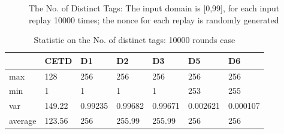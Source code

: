\documentclass{article}
\begin{document}
\begin{figure}
  \hspace{0in}
  \hspace{0in}
  \caption{The No. of Distinct Tags: The input domain is [0,99], for each input replay 10000 times; the nonce for each replay is randomly generated}
\label{fig:replay_10000} %
\end{figure}



\begin{table}[htbp] 
  \centering
  \caption{Statistic on the No. of distinct tags: 10000 rounds case}
    \begin{tabular}{l|l|l|l|l|l|l}
    \toprule
          & CETD  & D1    & D2    & D3    & D5    & D6 \\
    \midrule
    max   & 128   & 256   & 256   & 256   & 256   & 256 \\
    min   & 1     & 1     & 1     & 1     & 253   & 255 \\
    var   & 149.22 & 0.99235 & 0.99682 & 0.99671 & 0.002621 & 0.000107 \\
    average & 123.56 & 256   & 255.99 & 255.99 & 256   & 256 \\
    \bottomrule
    \end{tabular}%
\end{table}%
 \label{tab:addlabel}%
\end{document}
